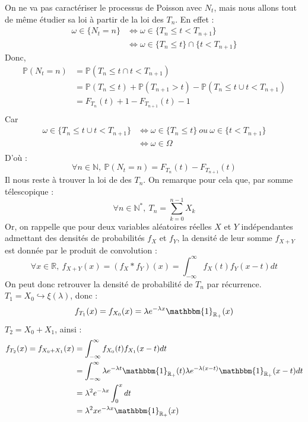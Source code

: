 \documentclass[a4paper, titlepage]{livret} %
\begin{document}
				On ne va pas caractériser le processus de Poisson avec $N_{t}$, mais nous allons tout de même étudier sa loi à partir de la loi des $T_{n}$.
				En effet :
				\[\begin{aligned}
					\omega \in \{N_{t} = n\} & \Leftrightarrow \omega \in \{T_{n} \leq t < T_{n + 1}\} \\
											 & \Leftrightarrow \omega \in \{T_{n} \leq t\} \cap \{t < T_{n + 1}\}
				\end{aligned}\]
				Donc, 
				\[\begin{aligned}
					\mathbb{P}(N_{t} = n) & = \mathbb{P}(T_{n} \leq t \cap t < T_{n + 1}) \\
										  & = \mathbb{P}(T_{n} \leq t) +  \mathbb{P}(T_{n + 1} > t) - \mathbb{P}(T_{n} \leq t \cup t < T_{n + 1})\\
										  & = F_{T_{n}}(t) +  1 - F_{T_{n+1}}(t) - 1\\
				\end{aligned}\]
				Car
				\[\begin{aligned}
					\omega \in \{T_{n} \leq t \cup t < T_{n + 1}\} & \Leftrightarrow \omega \in \{T_{n} \leq t\} \ ou \ \omega \in \{t < T_{n + 1}\}\\
																   & \Leftrightarrow \omega \in \Omega\\
				\end{aligned}\]
				D'où :
				\[\boxed{
					\forall n \in \mathbb{N}, \ \mathbb{P}(N_{t} = n) = F_{T_{n}}(t) - F_{T_{n+1}}(t)
				}\]
				Il nous reste à trouver la loi de des $T_{n}$.
				On remarque pour cela que, par somme télescopique :
				\[
					\forall n \in \mathbb{N}^{*}, \ T_{n} = \sum_{k = 0}^{n-1} X_{k}
				\]
				Or, on rappelle que pour deux variables aléatoires réelles $X$ et $Y$ indépendantes admettant des densités de probabilités $f_{X}$ et $f_{Y}$, la densité de leur somme $f_{X+Y}$ est donnée par le produit de convolution :
				\[
					\forall x \in \mathbb{R}, \ f_{X+Y}(x) = (f_{X}*f_{Y})(x) = \int_{-\infty}^{\infty} f_{X}(t)f_{Y}(x-t)dt
				\]
				On peut donc retrouver la densité de probabilité de $T_{n}$ par récurrence.
				$T_{1} = X_{0} \hookrightarrow \xi(\lambda)$, donc :
				\[
					f_{T_{1}}(x) = f_{X_{0}}(x) = \lambda e^{-\lambda x}\mathbbm{1}_{\mathbb{R}_{+}}(x)
				\]
				$T_{2} = X_{0} + X_{1}$, ainsi :
				\[\begin{aligned}
					f_{T_{2}}(x) = f_{X_{0} + X_{1}}(x) & = \int_{-\infty}^{\infty} f_{X_{0}}(t)f_{X_{1}}(x-t)dt\\
														& = \int_{-\infty}^{\infty} \lambda e^{-\lambda t}\mathbbm{1}_{\mathbb{R}_{+}}(t)\lambda e^{-\lambda (x-t)}\mathbbm{1}_{\mathbb{R}_{+}}(x-t)dt\\
														& = \lambda^{2} e^{-\lambda x}\int_{0}^{x}dt\\
														& = \lambda^{2} x e^{-\lambda x} \mathbbm{1}_{\mathbb{R}_{+}}(x)\\
				\end{aligned}\]
\end{document}
